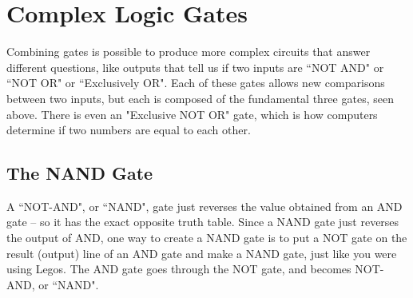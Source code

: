 \clearpage
\newpage

\section{Complex Logic Gates}

Combining gates is possible to produce more complex circuits that answer different questions, like outputs that tell us if two inputs are ``NOT AND" or ``NOT OR" or ``Exclusively OR". Each of these gates allows new comparisons between two inputs, but each is composed of the fundamental three gates, seen above. There is even an "Exclusive NOT OR" gate, which is how computers determine if two numbers are equal to each other.

\subsection*{The NAND Gate}

A ``NOT-AND", or ``NAND", gate just reverses the value obtained from an AND gate -- so it has the exact opposite truth table. Since a NAND gate just reverses the output of AND, one way to create a NAND gate is to put a NOT gate on the result (output) line of an AND gate and make a NAND gate, just like you were using Legos. The AND gate goes through the NOT gate, and becomes NOT-AND, or ``NAND".


